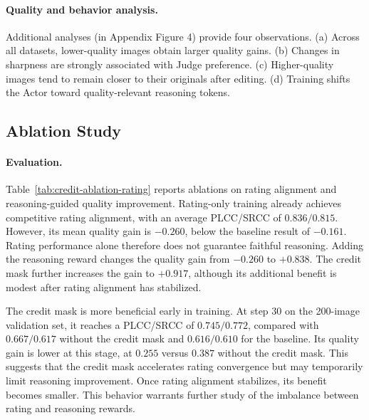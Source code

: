 \documentclass[letterpaper]{article} %
\begin{document}
\paragraph{Quality and behavior analysis.}
Additional analyses (in Appendix Figure 4) provide four observations. (a) Across all datasets,
lower-quality images obtain larger quality gains. (b) Changes in sharpness are
strongly associated with Judge preference. (c) Higher-quality images tend to
remain closer to their originals after editing. (d) Training shifts the Actor
toward quality-relevant reasoning tokens.

\subsection{Ablation Study}
\label{sec:ablation-study}

\paragraph{Evaluation.}
Table~\ref{tab:credit-ablation-rating} reports ablations on rating alignment and
reasoning-guided quality improvement. Rating-only training already achieves
competitive rating alignment, with an average PLCC/SRCC of $0.836/0.815$. However,
its mean quality gain is $-0.260$, below the baseline result of $-0.161$.
Rating performance alone therefore does not guarantee faithful reasoning.
Adding the reasoning reward changes the quality gain from $-0.260$ to
$+0.838$. The credit mask further increases the gain to $+0.917$, although its
additional benefit is modest after rating alignment has stabilized.

The credit mask is more beneficial early in training. At step 30 on the
200-image validation set, it reaches a PLCC/SRCC of $0.745/0.772$, compared
with $0.667/0.617$ without the credit mask and $0.616/0.610$ for the baseline.
Its quality gain is lower at this stage, at $0.255$ versus $0.387$ without the
credit mask. This suggests that the credit mask accelerates rating convergence
but may temporarily limit reasoning improvement. Once rating alignment
stabilizes, its benefit becomes smaller. This behavior warrants further study
of the imbalance between rating and reasoning rewards.
\end{document}
